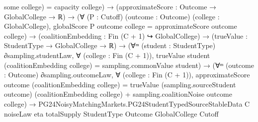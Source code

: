 \documentclass[10pt]{article}
\begin{document}
\begin{ReviewVerbatim}
                                                some college) =
                                            capacity college) →
                                        (approximateScore : Outcome → GlobalCollege → ℝ) →
                                          (∀ (P : Cutoff) (outcome : Outcome) (college : GlobalCollege),
                                              globalScore P outcome college = approximateScore outcome college) →
                                            (coalitionEmbedding : Fin (C + 1) ↪ GlobalCollege) →
                                              (trueValue : StudentType → GlobalCollege → ℝ) →
                                                (∀ᵐ (student : StudentType) ∂sampling.studentLaw,
                                                    ∀ (college : Fin (C + 1)),
                                                      trueValue student (coalitionEmbedding college) =
                                                        sampling.commonValue student) →
                                                  (∀ᵐ (outcome : Outcome) ∂sampling.outcomeLaw,
                                                      ∀ (college : Fin (C + 1)),
                                                        approximateScore outcome (coalitionEmbedding college) =
                                                          trueValue (sampling.sourceStudent outcome)
                                                              (coalitionEmbedding college) +
                                                            sampling.coalitionNoise outcome college) →
                                                    PG24NoisyMatchingMarkets.PG24StudentTypedSourceStableData C noiseLaw
                                                      eta totalSupply StudentType Outcome GlobalCollege Cutoff


\end{ReviewVerbatim}
\end{document}
